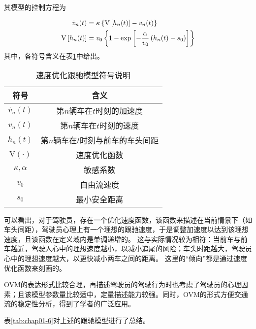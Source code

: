 其模型的控制方程为

\begin{align}
  \dot{v}_n(t) &= \kappa \left\{ \mathrm{V} \left[ h_n(t) \right] - v_n(t) \right\} \notag \\
  \mathrm{V} \left[ h_n(t) \right] &= v_0 \left\{ 1 - \exp \left[ - \frac{\alpha}{v_0}\left(h_n(t)-s_0\right) \right] \right\}
  \label{eq:chap01-4}
\end{align}
其中，各符号含义在表\ref{tab:chap01-5}中给出。

\begin{table}
  \centering
  \caption{速度优化跟驰模型符号说明}
  \begin{tabular}{cc}
    \toprule
    符号          &  含义                         \\
    \midrule
    $\dot{v_n}(t)$    & 第$n$辆车在$t$时刻的加速度        \\
    $v_n(t)$          & 第$n$辆车在$t$时刻的速度         \\
    $h_n(t)$          & 第$n$辆车在$t$时刻与前车的车头间距  \\
    $\mathrm{V}(\cdot)$        & 速度优化函数         \\
    $\kappa, \alpha$  & 敏感系数             \\
    $v_0$             & 自由流速度           \\
    $s_0$             & 最小安全距离        \\
    \bottomrule
  \end{tabular}
  \label{tab:chap01-5}
\end{table}

可以看出，对于驾驶员，存在一个优化速度函数，该函数来描述在当前情景下（如车头间距），驾驶员心理上有一个理想的跟驰速度，于是调整加速度以达到该理想速度，且该函数在定义域内是单调递增的。
这与实际情况较为相符：当前车与前车越近，驾驶人心中的理想速度越小，以减小追尾的风险；车头时距越大，驾驶员心中的理想速度越大，以更快减小两车之间的距离。
这里的“倾向”都是通过速度优化函数来刻画的。

OVM的表达形式比较合理，再描述驾驶员的驾驶行为时也考虑了驾驶员的心理因素；且该模型参数量比较适中，定量描述能力较强。同时，OVM的形式方便交通流的稳定性分析，得到了学者的广泛应用。

表\ref{tab:chap01-6}对上述的跟驰模型进行了总结。

